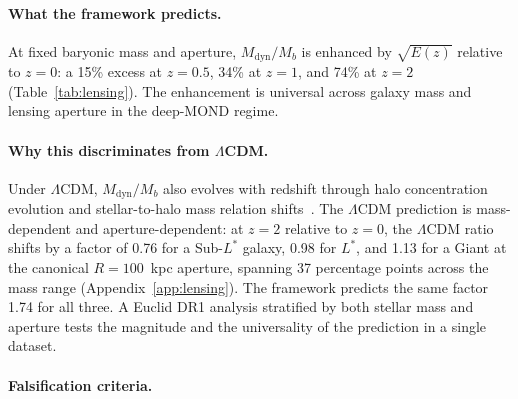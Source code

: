 \documentclass[
    aps,
    prd,
    reprint,
    superscriptaddress,
    nofootinbib,
    floatfix
]{revtex4-2}
\begin{document}
\paragraph*{What the framework predicts.}
At fixed baryonic mass and aperture, $M_\text{dyn}/M_b$ is enhanced
by $\sqrt{E(z)}$ relative to $z = 0$: a 15\% excess at $z = 0.5$,
34\% at $z = 1$, and 74\% at $z = 2$ (Table~\ref{tab:lensing}). The
enhancement is universal across galaxy mass and lensing aperture in
the deep-MOND regime.

\paragraph*{Why this discriminates from $\Lambda$CDM.}
Under $\Lambda$CDM, $M_\text{dyn}/M_b$ also evolves with redshift
through halo concentration evolution and stellar-to-halo mass
relation shifts~\cite{Moster2013, Duffy2008}. The $\Lambda$CDM
prediction is mass-dependent and aperture-dependent: at $z = 2$
relative to $z = 0$, the $\Lambda$CDM ratio shifts by a factor of
0.76 for a Sub-$L^*$ galaxy, 0.98 for $L^*$, and 1.13 for a Giant at
the canonical $R = 100$~kpc aperture, spanning 37 percentage points
across the mass range (Appendix~\ref{app:lensing}). The framework
predicts the same factor 1.74 for all three. A Euclid DR1 analysis
stratified by both stellar mass and aperture tests the magnitude and
the universality of the prediction in a single dataset.

\paragraph*{Falsification criteria.}
\end{document}
